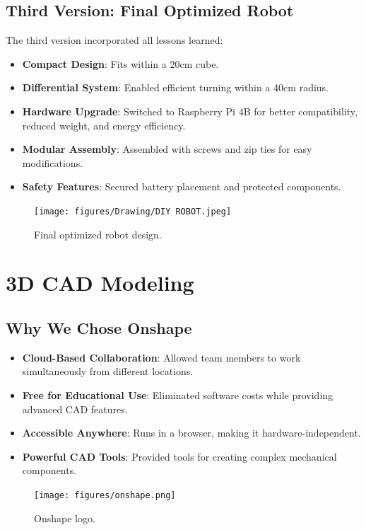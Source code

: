 \documentclass[12pt,a4paper]{article}
\begin{document}
\subsection{Third Version: Final Optimized Robot}
The third version incorporated all lessons learned:
\begin{itemize}
    \item \textbf{Compact Design}: Fits within a 20cm cube.
    \item \textbf{Differential System}: Enabled efficient turning within a 40cm radius.
    \item \textbf{Hardware Upgrade}: Switched to Raspberry Pi 4B for better compatibility, reduced weight, and energy efficiency.
    \item \textbf{Modular Assembly}: Assembled with screws and zip ties for easy modifications.
    \item \textbf{Safety Features}: Secured battery placement and protected components.
\end{itemize}

\begin{figure}[ht]
    \centering
    \texttt{[image: figures/Drawing/DIY ROBOT.jpeg]}
    \caption{Final optimized robot design.}
    \label{fig:final_robot}
\end{figure}

\section{3D CAD Modeling}
\subsection{Why We Chose Onshape}
\begin{itemize}
    \item \textbf{Cloud-Based Collaboration}: Allowed team members to work simultaneously from different locations.
    \item \textbf{Free for Educational Use}: Eliminated software costs while providing advanced CAD features.
    \item \textbf{Accessible Anywhere}: Runs in a browser, making it hardware-independent.
    \item \textbf{Powerful CAD Tools}: Provided tools for creating complex mechanical components.
\end{itemize}

\begin{figure}[ht]
    \centering
    \texttt{[image: figures/onshape.png]}
    \caption{Onshape logo.}
    \label{fig:onshape}
\end{figure}
\end{document}
